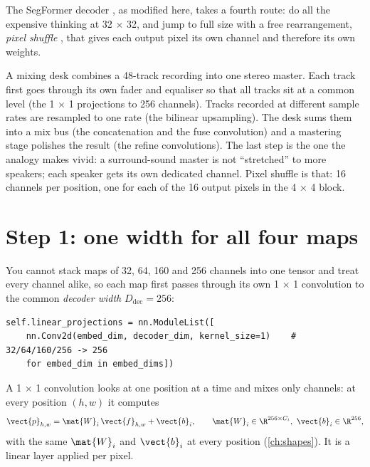 The SegFormer decoder \citep{xie2021segformer}, as modified here, takes a fourth route: do all the
expensive thinking at 32 $\times$ 32, and jump to full size with a free rearrangement,
\emph{pixel shuffle} \citep{shi2016realtime}, that gives each output pixel its own
channel and therefore its own weights.

\begin{analogy}
A mixing desk combines a 48-track recording into one stereo master. Each track first goes through its
own fader and equaliser so that all tracks sit at a common level (the 1 $\times$ 1 projections to 256
channels). Tracks recorded at different sample rates are resampled to one rate (the bilinear
upsampling). The desk sums them into a mix bus (the concatenation and the fuse convolution) and a
mastering stage polishes the result (the refine convolutions). The last step is the one the analogy
makes vivid: a surround-sound master is not ``stretched'' to more speakers; each speaker gets its own
dedicated channel. Pixel shuffle is that: 16 channels per position, one for each of the 16 output
pixels in the 4 $\times$ 4 block.
\end{analogy}

\section{Step 1: one width for all four maps}\label{sec:decoder:project}

You cannot stack maps of 32, 64, 160 and 256 channels into one tensor and treat every channel alike, so
each map first passes through its own 1 $\times$ 1 convolution to the common
\emph{decoder width} $D_{\text{dec}} = 256$:
\begin{lstlisting}
self.linear_projections = nn.ModuleList([
    nn.Conv2d(embed_dim, decoder_dim, kernel_size=1)    # 32/64/160/256 -> 256
    for embed_dim in embed_dims])
\end{lstlisting}
A 1 $\times$ 1 convolution looks at one position at a time and mixes only channels: at every position
$(h, w)$ it computes
\begin{equation}\label{eq:decoder:proj}
\vect{p}_{h,w} = \mat{W}_i\, \vect{f}_{h,w} + \vect{b}_i, \qquad \mat{W}_i \in \R^{256 \times C_i},\ \vect{b}_i \in \R^{256},
\end{equation}
with the same $\mat{W}_i$ and $\vect{b}_i$ at every position (\cref{ch:shapes}). It is a linear layer
applied per pixel.

